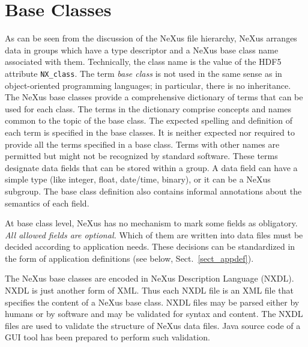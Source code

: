 \documentclass[%
 aip,
rsi,
 amsmath,amssymb,
 reprint,%
]{revtex4-1}
\begin{document}
\section{Base Classes}

As can be seen from the discussion of the NeXus file hierarchy, 
NeXus arranges data in groups which have a 
type descriptor and a NeXus base class name associated with them.
Technically, the class name is the value of the HDF5 attribute \texttt{NX\_class}.
The term \emph{base class} is not used in the same sense as in  
object-oriented programming languages; in particular, there is no inheritance.
The NeXus base classes provide a comprehensive dictionary of terms 
that can be used for each class. 
The terms in the dictionary comprise concepts and names common to the topic of the base class.
The expected spelling and definition of each term is specified in the base classes. 
It is neither expected nor required to provide all the terms specified in a base class. 
Terms with other names are permitted but might not be recognized by standard software.
These terms designate data fields that can be stored within a group.
A data field can have a simple type (like integer, float, date/time, binary),
or it can be a NeXus subgroup.
The base class definition also contains informal annotations
about the semantics of each field.

At base class level, NeXus has no mechanism to mark some fields as obligatory.
\emph{All allowed fields are optional.}
Which of them are written into data files must be decided
according to application needs.
These decisions can be standardized in the form of
application definitions (see below, Sect.~\ref{sect_appdef}).

The NeXus base classes are encoded in NeXus Description Language (NXDL)\cite{nxman}. NXDL is 
just another form of XML. Thus each NXDL file is an XML file that specifies the content 
of a NeXus base class. 
NXDL files may be parsed either by humans or by software and 
may be validated for syntax and content.  The NXDL files are used to validate the structure of
NeXus data files. Java source code of a GUI tool has been prepared\cite{nxvalidate} to perform such validation.%
\end{document}
